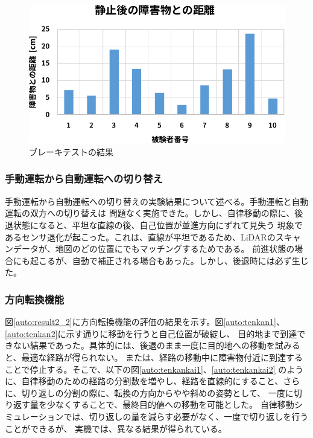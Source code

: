 \begin{figure}
  \begin{center}
    \includegraphics[width=.8\linewidth]{img/auto_62.pdf}
    \caption{ブレーキテストの結果}
    \label{auto:result1_3}
  \end{center}
\end{figure}

\subsubsection{手動運転から自動運転への切り替え}
手動運転から自動運転への切り替えの実験結果について述べる。手動運転と自動運転の双方への切り替えは
問題なく実施できた。しかし、自律移動の際に、後退状態になると、平坦な直線の後、自己位置が並進方向にずれて見失う
現象であるセンサ退化が起こった。これは、直線が平坦であるため、LiDARのスキャンデータが、地図のどの位置にでもマッチングするためである。
前進状態の場合にも起こるが、自動で補正される場合もあった。しかし、後退時には必ず生じた。

\subsubsection{方向転換機能}
図\ref{auto:result2_2}に方向転換機能の評価の結果を示す。図\ref{auto:tenkan1}、\ref{auto:tenkan2}に示す通りに移動を行うと自己位置が破綻し、
目的地まで到達できない結果であった。具体的には、後退のまま一度に目的地への移動を試みると、最適な経路が得られない。
または、経路の移動中に障害物付近に到達することで停止する。そこで、以下の図\ref{auto:tenkankai1}、\ref{auto:tenkankai2}
のように、自律移動のための経路の分割数を増やし、経路を直線的にすること、さらに、切り返しの分割の際に、転換の方向からやや斜めの姿勢として、
一度に切り返す量を少なくすることで、最終目的値への移動を可能とした。
自律移動シミュレーションでは、切り返しの量を減らす必要がなく、一度で切り返しを行うことができるが、
実機では、異なる結果が得られている。

